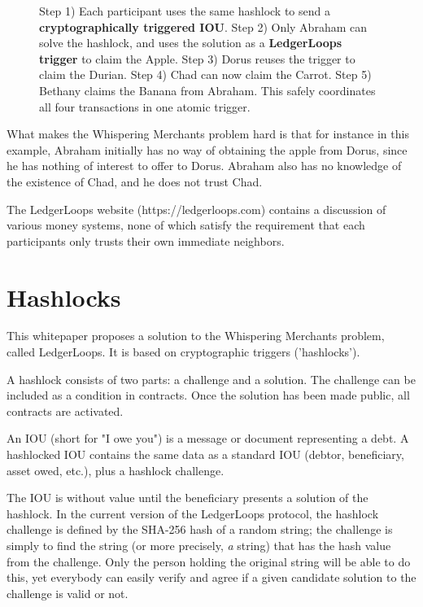 \documentclass[11pt,twoside,a4paper]{article}
\begin{document}
\begin{figure}
\caption{Step 1) Each participant uses the same hashlock to send a \textbf{\color{cyan} cryptographically triggered IOU}. Step 2) Only Abraham can solve the hashlock, and uses the solution as a \textbf{\color{magenta} LedgerLoops trigger} to claim the {\color{red} Apple}. Step 3) Dorus reuses the trigger to claim the {\color{green} Durian}. Step 4) Chad can now claim the {\color{orange} Carrot}. Step 5) Bethany claims the {\color{yellow} Banana} from Abraham. This safely coordinates all four transactions in one atomic trigger.}
\end{figure}

What makes the Whispering Merchants problem hard is that for instance in this example, Abraham initially has no way of obtaining the apple from Dorus, since he has nothing of interest to offer to Dorus. Abraham also has no knowledge of the existence of Chad, and he does not trust Chad.

The LedgerLoops website (https://ledgerloops.com) contains a discussion of various money systems, none of which satisfy the requirement that each participants only trusts their own immediate neighbors.

\section{Hashlocks}
This whitepaper proposes a solution to the Whispering Merchants problem, called LedgerLoops. It is based on cryptographic triggers ('hashlocks').

A hashlock consists of two parts: a challenge and a solution. The challenge can be included as a condition in contracts. Once the solution has been made public, all contracts are activated.

An IOU (short for "I owe you") is a message or document representing a debt.
A hashlocked IOU contains the same data as a standard IOU (debtor, beneficiary, asset owed, etc.), plus a hashlock challenge.

The IOU is without value until the beneficiary presents a solution of the hashlock. In the current version of the LedgerLoops protocol, the hashlock challenge is defined by the SHA-256 hash of a random string; the challenge is simply to find the string (or more precisely, \textit{a} string) that has the hash value from the challenge. Only the person holding the original string will be able to do this, yet everybody can easily verify and agree if a given candidate solution to the challenge is valid or not.
\end{document}
